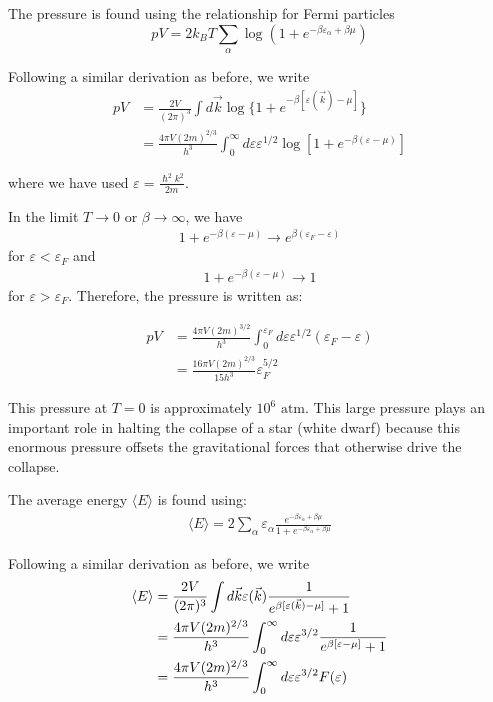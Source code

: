 \documentclass[book.tex]{subfiles}
\begin{document}
The pressure is found using the relationship for Fermi particles
\begin{equation}\label{Eq9}
pV = 2k_BT\sum_\alpha \log \left(1 + e^{-\beta \varepsilon_\alpha + \beta \mu} \right)
\end{equation}

Following a similar derivation as before, we write
\begin{align}\label{Eq10}
pV &= \frac{2V}{(2\pi)^3} \int d\vec{k} \log \{ 1 + e^{-\beta [ \varepsilon (\vec{k}) - \mu]} \} \\
&= \frac{4\pi V (2m)^{2/3}}{h^3} \int_0^\infty d\varepsilon \varepsilon^{1/2} \log \left[ 1 + e^{-\beta ( \varepsilon - \mu)} \right]
\end{align}

\noindent where we have used $\varepsilon = \frac{\hslash^2 k^2}{2m}$.

In the limit $T \rightarrow 0$ or $\beta \rightarrow \infty$, we have 
\begin{align} 
1 + e^{-\beta ( \varepsilon - \mu)} \rightarrow  e^{\beta ( \varepsilon_F - \varepsilon)}
\end{align}
for $\varepsilon < \varepsilon_F$ and 
\begin{align} 1 + e^{-\beta ( \varepsilon - \mu)} \rightarrow 1
\end{align}
for $\varepsilon > \varepsilon_F$. Therefore, the pressure is written as:

\begin{align}
pV &= \frac{4\pi V (2m)^{3/2}}{h^3} \int_0^{\varepsilon_F} d\varepsilon \varepsilon^{1/2} (\varepsilon_F - \varepsilon)\\
&= \frac{16\pi V (2m)^{2/3}}{15h^3} \varepsilon_F^{5/2} 
\end{align}

This pressure at $T = 0$ is approximately $10^6 \textrm{ atm}$. This large pressure plays an important role in halting the collapse of a star
(white dwarf) because this enormous pressure offsets the gravitational forces that otherwise drive the collapse.

The average energy $\langle E \rangle$ is found using:
\begin{align}\label{Eq12}
\langle E \rangle = 2\sum_\alpha \varepsilon_\alpha \frac{e^{-\beta \varepsilon_\alpha + \beta \mu}}{1 + e^{-\beta \varepsilon_\alpha + \beta \mu}}
\end{align}

Following a similar derivation as before, we write
\begin{align}
\langle E \rangle &= \frac{2V}{(2\pi)^3} \int d\vec{k} \varepsilon(\vec{k}) \frac{1}{e^{\beta [ \varepsilon(\vec{k}) - \mu]}+1} \notag\\
&= \frac{4\pi V (2m)^{2/3}}{h^3} \int_0^\infty d\varepsilon \varepsilon^{3/2} \frac{1}{e^{\beta [ \varepsilon - \mu]}+1} \notag\\
&= \frac{4\pi V (2m)^{2/3}}{h^3} \int_0^\infty d\varepsilon \varepsilon^{3/2} F(\varepsilon) \notag
\end{align}
\end{document}
